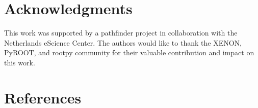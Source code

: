\documentclass[a4paper]{jpconf}
\begin{document}


\section{Acknowledgments}
This work was supported by a pathfinder project in collaboration with the Netherlands eScience Center.
The authors would like to thank the XENON, PyROOT, and rootpy community for their valuable contribution and impact on this work.
\section*{References}


\end{document}
